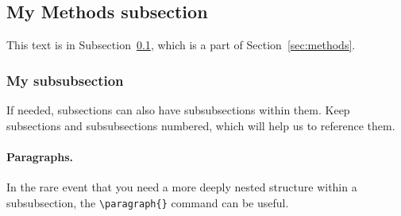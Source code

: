 \subsection{My Methods subsection}\label{subsec:my_subsec}

This text is in Subsection~\ref{subsec:my_subsec}, which is a part of Section~\ref{sec:methods}.

\subsubsection{My subsubsection}
If needed, subsections can also have subsubsections within them. Keep subsections and subsubsections numbered, which will help us to reference them.


\paragraph{Paragraphs.} In the rare event that you need a more deeply nested structure within a subsubsection, the \texttt{\textbackslash paragraph\{\}} command can be useful. 